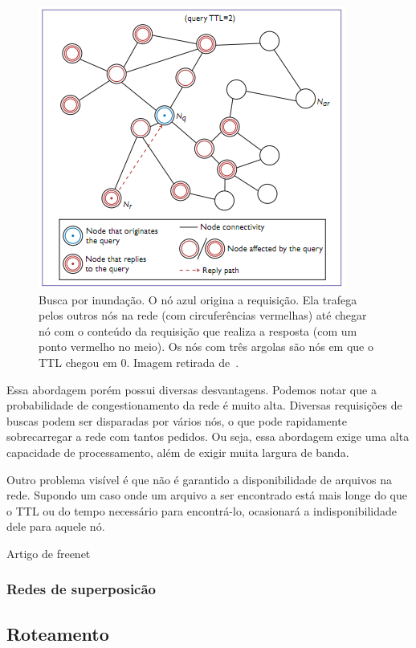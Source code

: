 \begin{figure}
	\centering
	\includegraphics[scale=0.75]{images/flooding-architecture.png}
	\caption{Busca por inundação. O nó azul origina a requisição. Ela trafega pelos outros nós na rede (com circuferências vermelhas) até chegar nó com o conteúdo da requisição que realiza a resposta (com um ponto vermelho no meio). Os nós com três argolas são nós em que o TTL chegou em 0. Imagem retirada de~\cite{dovalScalable01}.}
	\label{fig:flooding-architecture}
\end{figure}

Essa abordagem porém possui diversas desvantagens. Podemos notar que a probabilidade de congestionamento da rede é muito alta. Diversas requisições de buscas podem ser disparadas por vários nós, o que pode rapidamente sobrecarregar a rede com tantos pedidos. Ou seja, essa abordagem exige uma alta capacidade de processamento, além de exigir muita largura de banda.

Outro problema visível é que não é garantido a disponibilidade de arquivos na rede. Supondo um caso onde um arquivo a ser encontrado está mais longe do que o TTL ou do tempo necessário para encontrá-lo, ocasionará a indisponibilidade dele para aquele nó.

Artigo de freenet~\cite{ian02}
\subsubsection{Redes de superposicão}

\subsection{Roteamento}

